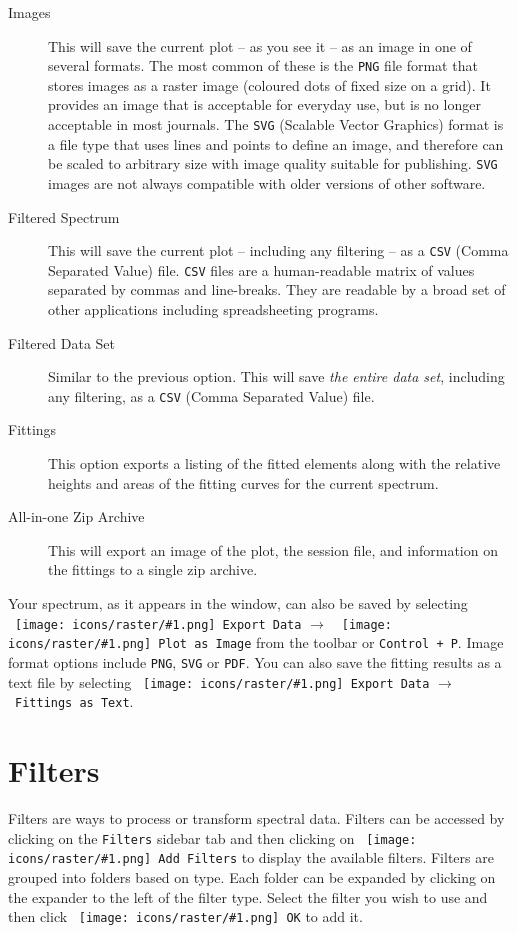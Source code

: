 \documentclass[article,twoside,11pt]{report}
\newcommand{\command}[1]{\texttt{#1}}
\newcommand{\icon}[1]{\texttt{[image: icons/raster/\#1.png]}}
\newcommand{\button}[2]{\ \command{\icon{#1} #2}}
\newcommand{\shortcut}[2]{\command{#1 + #2}}
\newcommand{\menu}[0]{$\rightarrow$}
\newcommand{\tocchapter}[1]{\cleardoublepage\chapter*{#1}\addcontentsline{toc}{chapter}{#1}}
\begin{document}
\begin{description}

\item [Images] This will save the current plot -- as you see it -- as an image in one of several formats. The most common of these is the \command{PNG} file format that stores images as a raster image (coloured dots of fixed size on a grid). It provides an image that is acceptable for everyday use, but is no longer acceptable in most journals. The \command{SVG} (Scalable Vector Graphics) format is a file type that uses lines and points to define an image, and therefore can be scaled to arbitrary size with image quality suitable for publishing. \command{SVG} images are not always compatible with older versions of other software.

\item [Filtered Spectrum] This will save the current plot -- including any filtering -- as a \command{CSV} (Comma Separated Value) file. \command{CSV} files are a human-readable matrix of values separated by commas and line-breaks. They are readable by a broad set of other applications including spreadsheeting programs.

\item [Filtered Data Set] Similar to the previous option. This will save {\em the entire data set}, including any filtering, as a \command{CSV} (Comma Separated Value) file.

\item [Fittings] This option exports a listing of the fitted elements along with the relative heights and areas of the fitting curves for the current spectrum.

\item [All-in-one Zip Archive] This will export an image of the plot, the session file, and information on the fittings to a single zip archive.

\end{description}

Your spectrum, as it appears in the window, can also be saved by selecting 
\button{document-export}{Export Data} \menu\ \button{mime-png}{Plot as Image} from the toolbar or \shortcut{Control}{P}. Image format options include \command{PNG}, \command{SVG} or \command{PDF}. You can also save the fitting results as a text file by selecting \button{document-export}{Export Data} \menu\ \command{Fittings as Text}.



\tocchapter{Filters}

Filters are ways to process or transform spectral data. Filters can be accessed by clicking on the \command{Filters} sidebar tab and then clicking on \button{edit-add}{Add Filters} to display the available filters. Filters are grouped into folders based on type. Each folder can be expanded by clicking on the expander to the left of the filter type. Select the filter you wish to use and then click \button{choose-ok}{OK} to add it. 
\end{document}

